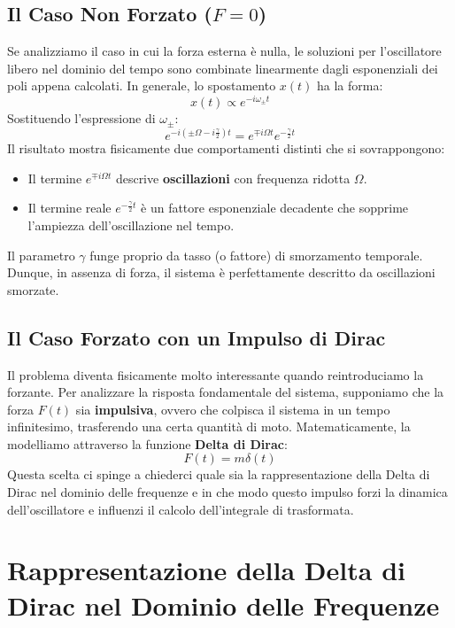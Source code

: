 \subsection{Il Caso Non Forzato ($F=0$)}
Se analizziamo il caso in cui la forza esterna è nulla, le soluzioni per l'oscillatore libero nel dominio del tempo sono combinate linearmente dagli esponenziali dei poli appena calcolati. In generale, lo spostamento $x(t)$ ha la forma:
\begin{equation}
x(t) \propto e^{-i \omega_{\pm} t}
\end{equation}
Sostituendo l'espressione di $\omega_{\pm}$:
\begin{equation}
e^{-i \left(\pm \Omega - i\frac{\gamma}{2}\right) t} = e^{\mp i \Omega t} e^{-\frac{\gamma}{2} t}
\end{equation}
Il risultato mostra fisicamente due comportamenti distinti che si sovrappongono:
\begin{itemize}
\item Il termine $e^{\mp i \Omega t}$ descrive \textbf{oscillazioni} con frequenza ridotta $\Omega$.
\item Il termine reale $e^{-\frac{\gamma}{2} t}$ è un fattore esponenziale decadente che sopprime l'ampiezza dell'oscillazione nel tempo.
\end{itemize}
Il parametro $\gamma$ funge proprio da tasso (o fattore) di smorzamento temporale. Dunque, in assenza di forza, il sistema è perfettamente descritto da oscillazioni smorzate.

\subsection{Il Caso Forzato con un Impulso di Dirac}
Il problema diventa fisicamente molto interessante quando reintroduciamo la forzante. Per analizzare la risposta fondamentale del sistema, supponiamo che la forza $F(t)$ sia \textbf{impulsiva}, ovvero che colpisca il sistema in un tempo infinitesimo, trasferendo una certa quantità di moto.
Matematicamente, la modelliamo attraverso la funzione \textbf{Delta di Dirac}:
\begin{equation}
F(t) = m \delta(t)
\end{equation}
Questa scelta ci spinge a chiederci quale sia la rappresentazione della Delta di Dirac nel dominio delle frequenze e in che modo questo impulso forzi la dinamica dell'oscillatore e influenzi il calcolo dell'integrale di trasformata.

\section{Rappresentazione della Delta di Dirac nel Dominio delle Frequenze}

